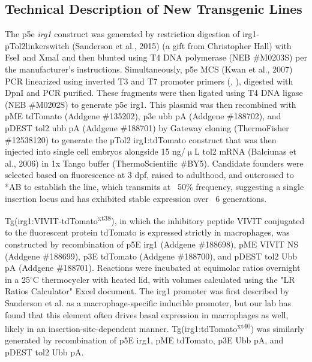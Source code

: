 \citep{Kim2017}
\citep{Ma2017}
\citep{Sugimoto2017}


\subsection{Technical Description of New Transgenic Lines}

The p5e \textit{irg1} construct was generated by restriction digestion of irg1-pTol2linkerswitch (Sanderson et al., 2015) (a gift from Christopher Hall) with FseI and XmaI and then blunted using T4 DNA polymerase (NEB \#M0203S) per the manufacturer's instructions. Simultaneously, p5e MCS (Kwan et al., 2007) PCR linearized using inverted T3 and T7 promoter primers (, ), digested with DpnI and PCR purified. These fragments were then ligated using T4 DNA ligase (NEB \#M0202S) to generate p5e irg1. This plasmid was then recombined with pME tdTomato (Addgene \#135202), p3e ubb pA (Addgene \#188702), and pDEST tol2 ubb pA (Addgene \#188701) by Gateway cloning (ThermoFisher \#12538120) to generate the pTol2 irg1:tdTomato construct that was then injected into single cell embryos alongside 15 ng/$\upmu$L tol2 mRNA (Balciunas et al., 2006) in 1x Tango buffer (ThermoScientific \#BY5). Candidate founders were selected based on fluorescence at 3 dpf, raised to adulthood, and outcrossed to *AB to establish the line, which transmits at ~50\% frequency, suggesting a single insertion locus and has exhibited stable expression over ~6 generations.

Tg(irg1:VIVIT-tdTomato\textsuperscript{xt38}), in which the inhibitory peptide VIVIT conjugated to the fluorescent protein tdTomato is expressed strictly in macrophages, was constructed by recombination of p5E irg1 (Addgene \#188698), pME VIVIT NS (Addgene \#188699), p3E tdTomato (Addgene \#188700), and pDEST tol2 Ubb pA (Addgene \#188701). Reactions were incubated at equimolar ratios overnight in a 25$^{\circ}$C thermocycler with heated lid, with volumes calculated using the "LR Ratios Calculator" Excel document. The irg1 promoter was first described by Sanderson et al. as a macrophage-specific inducible promoter, but our lab has found that this element often drives basal expression in macrophages as well, likely in an insertion-site-dependent manner. Tg(irg1:tdTomato\textsuperscript{xt40}) was similarly generated by recombination of p5E irg1, pME tdTomato, p3E Ubb pA, and pDEST tol2 Ubb pA. 

